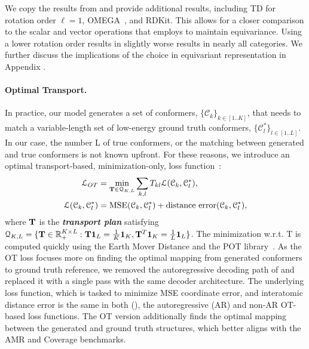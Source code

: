 We copy the results from  and provide additional results, including TD for rotation order $\ell = 1$, OMEGA~\citep{omega}, and RDKit. This allows for a closer comparison to the scalar and vector operations that \model employs to maintain equivariance. Using a lower rotation order results in slightly worse results in nearly all categories. We further discuss the implications of the choice in equivariant representation in Appendix .

\paragraph{Optimal Transport.} In practice, our model generates a set of conformers, $\{\mathcal{C}_k \}_{k \in [1..K]}$, that needs to match a variable-length set of low-energy ground truth conformers,  $\{\mathcal{C}^*_l\}_{l \in [1..L]}$. In our case, the number L of true conformers, or the matching between generated and true conformers is not known upfront.
For these reasons, we introduce an optimal transport-based, minimization-only, loss function~\citep{GeoMol}:
\begin{equation}
\begin{aligned}
    \mathcal{L}_{OT} &=  \min_{{\mathbf T}\in\mathcal{Q}_{K,L}} \sum_{k,l}T_{kl} \mathcal{L}(\mathcal{C}_k, \mathcal{C}^*_l), \\ 
    \mathcal{L}(\mathcal{C}_k, \mathcal{C}^*_l) &= \text{MSE}(\mathcal{C}_k, \mathcal{C}^*_l) + \text{distance error}(\mathcal{C}_k, \mathcal{C}^*_l),
    \label{eq:ot_loss}
\end{aligned}
\end{equation}
where ${\mathbf T}$ is the \textbf{\textit{transport plan}} satisfying $\mathcal{Q}_{K,L} = \{{\mathbf T} \in \mathbb{R}_+^{K\times L} : {\mathbf T} \mathbf{1}_L=\frac{1}{K}\mathbf{1}_K, {\mathbf T}^T \mathbf{1}_K=\frac{1}{L}\mathbf{1}_L \}$.
The minimization w.r.t. T is computed quickly using the Earth Mover Distance and the POT library~\citep{OT}. As the OT loss focuses more on finding the optimal mapping from generated conformers to ground truth reference, we removed the autoregressive decoding path of \model and replaced it with a single pass with the same decoder architecture. The underlying loss function, which is tasked to minimize MSE coordinate error, and interatomic distance error is the same in both (), the autoregressive (AR) and non-AR OT-based loss functions. The OT version additionally finds the optimal mapping between the generated and ground truth structures, which better aligns with the AMR and Coverage benchmarks.

